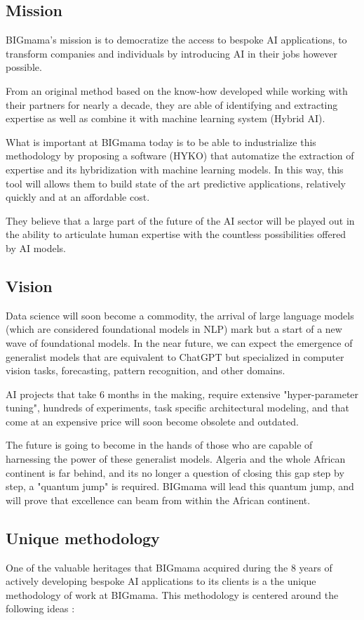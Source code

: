 \documentclass[a4paper,12pt]{article}
\begin{document}
\subsection{Mission}
BIGmama's mission is to democratize the access to bespoke AI applications, to transform companies and individuals by introducing AI in their jobs however possible. 

From an original method based on the know-how developed while working with their partners for nearly a decade, 
they are able of identifying and extracting expertise as well as combine it with machine learning system (Hybrid AI).

What is important at BIGmama today is to be able to industrialize this methodology by proposing a software (HYKO) that automatize the extraction of expertise and 
its hybridization with machine learning models. In this way, this tool will allows them to build state of the art predictive applications, relatively quickly and at an affordable cost.

They believe that a large part of the future of the AI sector will be played out in the ability to articulate human expertise with the countless possibilities offered by AI models.

\subsection{Vision}
Data science will soon become a commodity, the arrival of large language models (which are considered foundational models in NLP) mark but a start of a new wave of foundational models. In the near future, we can expect the emergence of generalist models that are equivalent to ChatGPT but specialized in computer vision tasks, forecasting, pattern recognition, and other domains.

AI projects that take 6 months in the making, require extensive "hyper-parameter tuning", hundreds of experiments, task specific architectural modeling, and that come at an expensive price will soon become obsolete and outdated.

The future is going to become in the hands of those who are capable of harnessing the power of these generalist models. Algeria and the whole African continent is far behind, and its no longer a question of closing this gap step by step, a "quantum jump" is required. BIGmama will lead this quantum jump, and will prove that excellence can beam from within the African continent. 

\subsection{Unique methodology}
One of the valuable heritages that BIGmama acquired during the 8 years of actively developing bespoke AI applications to its clients is a the unique methodology of work at BIGmama. 
This methodology is centered around the following ideas : 
\end{document}
